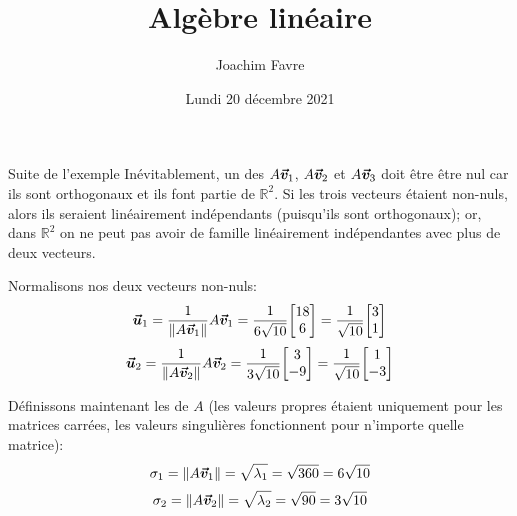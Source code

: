 \documentclass[a4paper]{article}
\title{Algèbre linéaire}
\author{Joachim Favre}
\date{Lundi 20 décembre 2021}
\begin{document}
\maketitle


\begin{parag}{Suite de l'exemple}
    Inévitablement, un des $A \bm{\protect\vec{v}}_1$, $A \bm{\protect\vec{v}}_2$ et $A \bm{\protect\vec{v}}_3$ doit être être nul car ils sont orthogonaux et ils font partie de $\mathbb{R}^2$. Si les trois vecteurs étaient non-nuls, alors ils seraient linéairement indépendants (puisqu'ils sont orthogonaux); or, dans $\mathbb{R}^2$ on ne peut pas avoir de famille linéairement indépendantes avec plus de deux vecteurs.

    Normalisons nos deux vecteurs non-nuls:
    \[\bvec{u}_1 = \frac{1}{\left\|A \bvec{v}_1\right\|} A \bvec{v}_1 = \frac{1}{6\sqrt{10}} \begin{bmatrix} 18 \\ 6 \end{bmatrix} = \frac{1}{\sqrt{10}} \begin{bmatrix} 3 \\ 1 \end{bmatrix} \]
    \[\bvec{u}_2 = \frac{1}{\left\|A \bvec{v}_2\right\|} A \bvec{v}_2 = \frac{1}{3\sqrt{10}} \begin{bmatrix} 3 \\ -9 \end{bmatrix} = \frac{1}{\sqrt{10}} \begin{bmatrix} 1 \\ -3 \end{bmatrix} \]

    Définissons maintenant les  de $A$ (les valeurs propres étaient uniquement pour les matrices carrées, les valeurs singulières fonctionnent pour n'importe quelle matrice):
    \[\sigma_1 = \left\|A \bvec{v}_1\right\| = \sqrt{\lambda_1} = \sqrt{360} = 6\sqrt{10}\]
    \[\sigma_2 = \left\|A \bvec{v}_2\right\| = \sqrt{\lambda_2} = \sqrt{90} = 3\sqrt{10}\]


\end{parag}
\end{document}
